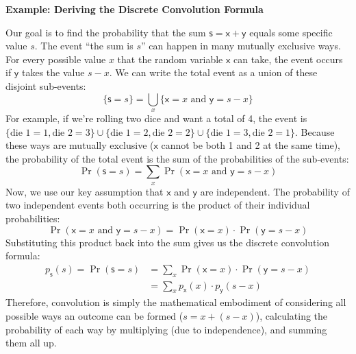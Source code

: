 \begin{exampleBox}
    \textbf{Example: Deriving the Discrete Convolution Formula}

    Our goal is to find the probability that the sum $\mathsf{s} = \mathsf{x} + \mathsf{y}$ equals some specific value $s$. The event ``the sum is $s$'' can happen in many mutually exclusive ways. For every possible value $x$ that the random variable $\mathsf{x}$ can take, the event occurs if $\mathsf{y}$ takes the value $s-x$. We can write the total event as a union of these disjoint sub-events:
    \begin{equation}
        \{\mathsf{s} = s\} = \bigcup_{x} \{\mathsf{x}=x \text{ and } \mathsf{y}=s-x\}
    \end{equation}
    For example, if we're rolling two dice and want a total of 4, the event is $\{\text{die 1}=1, \text{die 2}=3\} \cup \{\text{die 1}=2, \text{die 2}=2\} \cup \{\text{die 1}=3, \text{die 2}=1\}$. Because these ways are mutually exclusive ($\mathsf{x}$ cannot be both 1 and 2 at the same time), the probability of the total event is the sum of the probabilities of the sub-events:
    \begin{equation}
        \Pr(\mathsf{s}=s) = \sum_{x} \Pr(\mathsf{x}=x \text{ and } \mathsf{y}=s-x)
    \end{equation}
    Now, we use our key assumption that $\mathsf{x}$ and $\mathsf{y}$ are independent. The probability of two independent events both occurring is the product of their individual probabilities:
    \begin{equation}
        \Pr(\mathsf{x}=x \text{ and } \mathsf{y}=s-x) = \Pr(\mathsf{x}=x) \cdot \Pr(\mathsf{y}=s-x)
    \end{equation}
    Substituting this product back into the sum gives us the discrete convolution formula:
    \begin{align}
        p_{\mathsf{s}}(s) = \Pr(\mathsf{s}=s) &= \sum_{x} \Pr(\mathsf{x}=x) \cdot \Pr(\mathsf{y}=s-x) \nonumber\\
        &= \sum_{x} p_{\mathsf{x}}(x) \cdot p_{\mathsf{y}}(s-x)
    \end{align}
    Therefore, convolution is simply the mathematical embodiment of considering all possible ways an outcome can be formed ($s = x + (s-x)$), calculating the probability of each way by multiplying (due to independence), and summing them all up.
\end{exampleBox}

